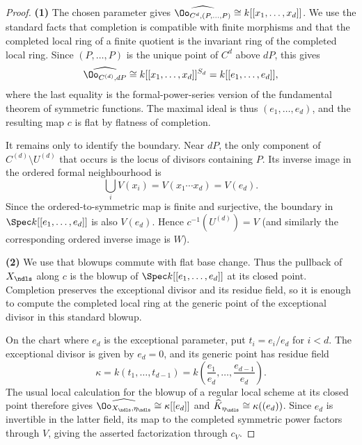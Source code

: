 \begin{proof}
    \textbf{(1)} The chosen parameter gives
    $\widehat{\Oo_{C^d,(P,\dots,P)}}\cong k[[x_1,\dots,x_d]]$.
    We use the standard facts that completion is compatible with finite
    morphisms and that the completed local ring of a finite quotient is the
    invariant ring of the completed local ring.  Since $(P,\dots,P)$ is the
    unique point of $C^d$ above $dP$, this gives
    \[
        \widehat{\Oo_{C^{(d)},dP}}
        \cong k[[x_1,\dots,x_d]]^{S_d}
        =k[[e_1,\dots,e_d]],
    \]
    where the last equality is the formal-power-series version of the
    fundamental theorem of symmetric functions.  The maximal ideal is thus
    $(e_1,\dots,e_d)$, and the resulting map $c$ is flat by flatness of
    completion.

    It remains only to identify the boundary.  Near $dP$, the only component
    of $C^{(d)}\setminus U^{(d)}$ that occurs is the locus of divisors
    containing $P$.  Its inverse image in the ordered formal neighbourhood is
    \[
        \bigcup_i V(x_i)=V(x_1\cdots x_d)=V(e_d).
    \]
    Since the ordered-to-symmetric map is finite and surjective, the boundary
    in $\Spec k[[e_1,\dots,e_d]]$ is also $V(e_d)$.  Hence
    $c^{-1}(U^{(d)})=V$ (and similarly the corresponding ordered inverse image
    is $W$).

    \textbf{(2)} We use that blowups commute with flat base change.  Thus the
    pullback of $X_\ndls$ along $c$ is the blowup of
    $\Spec k[[e_1,\dots,e_d]]$ at its closed point.  Completion preserves the
    exceptional divisor and its residue field, so it is enough to compute the
    completed local ring at the generic point of the exceptional divisor in
    this standard blowup.

    On the chart where $e_d$ is the exceptional parameter, put
    $t_i=e_i/e_d$ for $i<d$.  The exceptional divisor is given by $e_d=0$,
    and its generic point has residue field
    \[
        \kappa=k(t_1,\dots,t_{d-1})
        =k\left(\frac{e_1}{e_d},\dots,\frac{e_{d-1}}{e_d}\right).
    \]
    The usual local calculation for the blowup of a regular local scheme at
    its closed point therefore gives
    $\widehat{\Oo_{X_\ndls,\eta_\ndls}}\cong\kappa[[e_d]]$ and
    $\widehat K_{\eta_\ndls}\cong\kappa((e_d))$.  Since $e_d$ is invertible
    in the latter field, its map to the completed symmetric power factors
    through $V$, giving the asserted factorization through $c_V$.


\end{proof}

